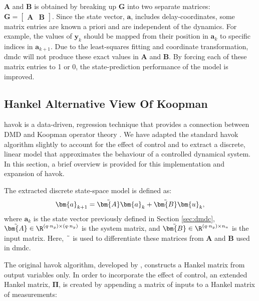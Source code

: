     $\bm{A}$ and $\bm{B}$ is obtained by breaking up $\bm{G}$ into two separate matrices:
    \(
        \bm{G} = \begin{bmatrix} \bm{A} & \bm{B} \end{bmatrix}.
    \)
    Since the state vector, $\bm{a}$, includes delay-coordinates, some matrix entries are known a priori and are independent of the dynamics. For example, the values of $\bm{y}_{k}$ should be mapped from their position in $\bm{a}_k$ to specific indices in $\bm{a}_{k+1}$. Due to the least-squares fitting and coordinate transformation, \gls{dmdc} will not produce these exact values in $\bm{A}$ and $\bm{B}$. By forcing each of these matrix entries to 1 or 0, the state-prediction performance of the model is improved.
    \subsection{Hankel Alternative View Of Koopman}
% 
    \par
    \gls{havok} is a data-driven, regression technique that provides a connection between DMD and Koopman operator theory \citep{Brunton2017, Champion2019}. 
    We have adapted the standard \gls{havok} algorithm slightly to account for the effect of control and to extract a discrete, linear model that approximates the behaviour of a controlled dynamical system.
    In this section, a brief overview is provided for this implementation and expansion of \mbox{\gls{havok}}.
    \par
    The extracted discrete state-space model is defined as:
    \begin{equation} \label{eq:havoc_state_space}
        \bm{a}_{k+1} = \Tilde{\bm{A}} \bm{a}_k + \Tilde{\bm{B}} \bm{u}_k ,
    \end{equation}
    where $\bm{a}_k$ is the state vector previously defined in Section \ref{sec:dmdc}, 
    \( \Tilde{\bm{A}} \in \R^{(q \cdot n_y) \times (q \cdot n_y)} \) is the system matrix, 
    and \( \Tilde{\bm{B}} \in \R^{(q \cdot n_y) \times n_u} \) is the input matrix. 
    Here, $\Tilde{\phantom{a}}$ is used to differentiate these matrices from $\bm{A}$ and $\bm{B}$ used in \gls{dmdc}.
    \par
    The original \gls{havok} algorithm, developed by \citet{Brunton2017}, constructs a Hankel matrix from output variables only. 
    In order to incorporate the effect of control, an extended Hankel matrix, $\bm{\Pi}$, is created by appending a matrix of inputs to a Hankel matrix of measurements:
